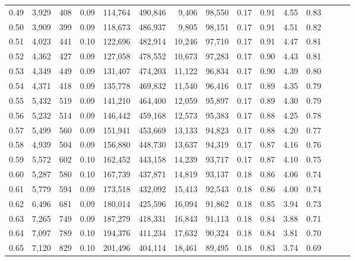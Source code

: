 \begin{tabular}{rrrrrrrrrrrrrrr}
0.49 &   3,929 &    408 &  0.09 &  114,764 &  490,846 &    9,406 &   98,550 &  0.17 &  0.91 &  4.55 &      0.83 \\
0.50 &   3,909 &    399 &  0.09 &  118,673 &  486,937 &    9,805 &   98,151 &  0.17 &  0.91 &  4.51 &      0.82 \\
0.51 &   4,023 &    441 &  0.10 &  122,696 &  482,914 &   10,246 &   97,710 &  0.17 &  0.91 &  4.47 &      0.81 \\
0.52 &   4,362 &    427 &  0.09 &  127,058 &  478,552 &   10,673 &   97,283 &  0.17 &  0.90 &  4.43 &      0.81 \\
0.53 &   4,349 &    449 &  0.09 &  131,407 &  474,203 &   11,122 &   96,834 &  0.17 &  0.90 &  4.39 &      0.80 \\
0.54 &   4,371 &    418 &  0.09 &  135,778 &  469,832 &   11,540 &   96,416 &  0.17 &  0.89 &  4.35 &      0.79 \\
0.55 &   5,432 &    519 &  0.09 &  141,210 &  464,400 &   12,059 &   95,897 &  0.17 &  0.89 &  4.30 &      0.79 \\
0.56 &   5,232 &    514 &  0.09 &  146,442 &  459,168 &   12,573 &   95,383 &  0.17 &  0.88 &  4.25 &      0.78 \\
0.57 &   5,499 &    560 &  0.09 &  151,941 &  453,669 &   13,133 &   94,823 &  0.17 &  0.88 &  4.20 &      0.77 \\
0.58 &   4,939 &    504 &  0.09 &  156,880 &  448,730 &   13,637 &   94,319 &  0.17 &  0.87 &  4.16 &      0.76 \\
0.59 &   5,572 &    602 &  0.10 &  162,452 &  443,158 &   14,239 &   93,717 &  0.17 &  0.87 &  4.10 &      0.75 \\
0.60 &   5,287 &    580 &  0.10 &  167,739 &  437,871 &   14,819 &   93,137 &  0.18 &  0.86 &  4.06 &      0.74 \\
0.61 &   5,779 &    594 &  0.09 &  173,518 &  432,092 &   15,413 &   92,543 &  0.18 &  0.86 &  4.00 &      0.74 \\
0.62 &   6,496 &    681 &  0.09 &  180,014 &  425,596 &   16,094 &   91,862 &  0.18 &  0.85 &  3.94 &      0.73 \\
0.63 &   7,265 &    749 &  0.09 &  187,279 &  418,331 &   16,843 &   91,113 &  0.18 &  0.84 &  3.88 &      0.71 \\
0.64 &   7,097 &    789 &  0.10 &  194,376 &  411,234 &   17,632 &   90,324 &  0.18 &  0.84 &  3.81 &      0.70 \\
0.65 &   7,120 &    829 &  0.10 &  201,496 &  404,114 &   18,461 &   89,495 &  0.18 &  0.83 &  3.74 &      0.69 \\

\end{tabular}
